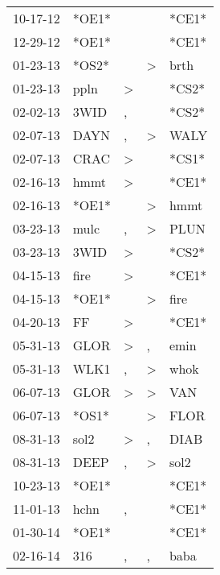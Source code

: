\begin{supertabular}{lllll}
 10-17-12 &  *OE1* &                  &                  &  *CE1* \\
 12-29-12 &  *OE1* &                  &                  &  *CE1* \\
 01-23-13 &  *OS2* &                  &     \textgreater &   brth \\
 01-23-13 &   ppln &     \textgreater &                  &  *CS2* \\
 02-02-13 &   3WID &                , &                  &  *CS2* \\
 02-07-13 &   DAYN &                , &     \textgreater &   WALY \\
 02-07-13 &   CRAC &     \textgreater &                  &  *CS1* \\
 02-16-13 &   hmmt &     \textgreater &                  &  *CE1* \\
 02-16-13 &  *OE1* &                  &     \textgreater &   hmmt \\
 03-23-13 &   mulc &                , &     \textgreater &   PLUN \\
 03-23-13 &   3WID &     \textgreater &                  &  *CS2* \\
 04-15-13 &   fire &     \textgreater &                  &  *CE1* \\
 04-15-13 &  *OE1* &                  &     \textgreater &   fire \\
 04-20-13 &     FF &     \textgreater &                  &  *CE1* \\
 05-31-13 &   GLOR &     \textgreater &                , &   emin \\
 05-31-13 &   WLK1 &                , &     \textgreater &   whok \\
 06-07-13 &   GLOR &     \textgreater &     \textgreater &    VAN \\
 06-07-13 &  *OS1* &                  &     \textgreater &   FLOR \\
 08-31-13 &   sol2 &     \textgreater &                , &   DIAB \\
 08-31-13 &   DEEP &                , &     \textgreater &   sol2 \\
 10-23-13 &  *OE1* &                  &                  &  *CE1* \\
 11-01-13 &   hchn &                , &                  &  *CE1* \\
 01-30-14 &  *OE1* &                  &                  &  *CE1* \\
 02-16-14 &    316 &                , &                , &   baba \\

\end{supertabular}
